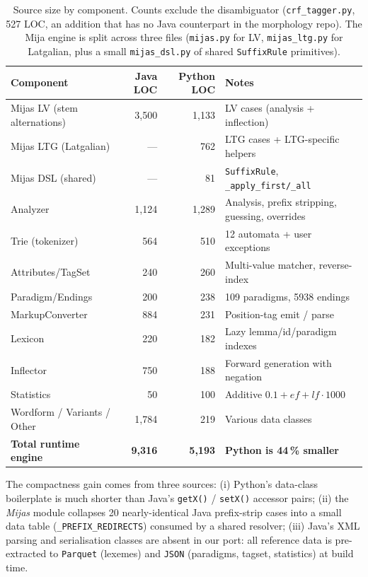 \documentclass[11pt,a4paper]{article}
\begin{document}
\begin{table}[h]
\centering
\small
\begin{tabular}{lrrp{5.5cm}}
\toprule
\textbf{Component} & \textbf{Java LOC} & \textbf{Python LOC} & \textbf{Notes} \\
\midrule
Mijas LV (stem alternations) & 3{,}500 & 1{,}133 & LV cases (analysis + inflection) \\
Mijas LTG (Latgalian) & --- & 762 & LTG cases + LTG-specific helpers \\
Mijas DSL (shared) & --- & 81 & \texttt{SuffixRule}, \texttt{\_apply\_first/\_all} \\
Analyzer & 1{,}124 & 1{,}289 & Analysis, prefix stripping, guessing, overrides \\
Trie (tokenizer) & 564 & 510 & 12 automata + user exceptions \\
Attributes/TagSet & 240 & 260 & Multi-value matcher, reverse-index \\
Paradigm/Endings & 200 & 238 & 109 paradigms, 5938 endings \\
MarkupConverter & 884 & 231 & Position-tag emit / parse \\
Lexicon & 220 & 182 & Lazy lemma/id/paradigm indexes \\
Inflector & 750 & 188 & Forward generation with negation \\
Statistics & 50 & 100 & Additive $0.1 + ef + lf \cdot 1000$ \\
Wordform / Variants / Other & 1{,}784 & 219 & Various data classes \\
\midrule
\textbf{Total runtime engine} & \textbf{9{,}316} & \textbf{5{,}193} & \textbf{Python is 44\,\% smaller} \\
\bottomrule
\end{tabular}
\caption{Source size by component. Counts exclude the disambiguator
(\texttt{crf\_tagger.py}, 527 LOC, an addition that has no Java counterpart
in the morphology repo). The Mija engine is split across three files
(\texttt{mijas.py} for LV, \texttt{mijas\_ltg.py} for Latgalian, plus a
small \texttt{mijas\_dsl.py} of shared \texttt{SuffixRule} primitives).}
\label{tab:loc}
\end{table}

The compactness gain comes from three sources:
(i) Python's data-class boilerplate is much shorter than Java's \texttt{getX()} /
\texttt{setX()} accessor pairs;
(ii) the \textit{Mijas} module collapses 20 nearly-identical Java prefix-strip
cases into a small data table (\texttt{\_PREFIX\_REDIRECTS}) consumed by a
shared resolver;
(iii) Java's XML parsing and serialisation classes are absent in our port:
all reference data is pre-extracted to \texttt{Parquet} (lexemes) and
\texttt{JSON} (paradigms, tagset, statistics) at build time.
\end{document}
